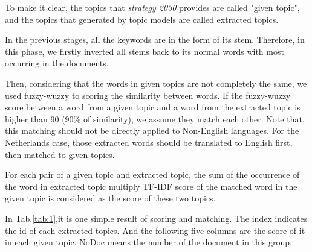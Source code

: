 \documentclass[sigchi]{acmart}
\begin{document}
To make it clear, the topics that \textit{strategy 2030} provides are called "given topic", and the topics that generated by topic models are called extracted topics.

In the previous stages, all the keywords are in the form of its stem. Therefore, in this phase, we firstly inverted all stems back to its normal words with most occurring in the documents.

Then, considering that the words in given topics are not completely the same, we used fuzzy-wuzzy to scoring the similarity between words. If the fuzzy-wuzzy score between a word from a given topic and a word from the extracted topic is higher than 90 (90\% of similarity), we assume they match each other. Note that, this matching should not be directly applied to Non-English languages. For the Netherlands case, those extracted words should be translated to English first, then matched to given topics.

For each pair of a given topic and extracted topic, the sum of the occurrence of the word in extracted topic multiply TF-IDF score of the matched word in the given topic is considered as the score of these two topics.

In Tab.\ref{tab:1},it is one simple result of scoring and matching. The index indicates the id of each extracted topics. And the following five columns are the score of it in each given topic. NoDoc means the number of the document in this group.
\end{document}
